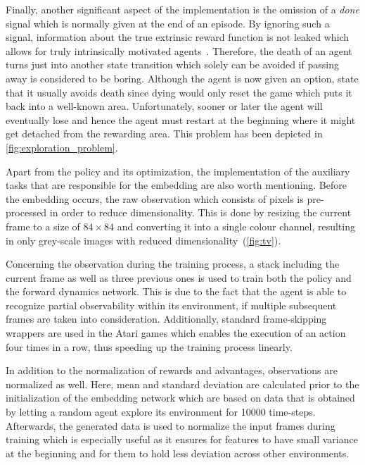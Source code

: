 \documentclass[draft,final]{vutinfth} %
\newcommand{\pautoref}[1]{(\autoref{#1})}
\begin{document}
    Finally, another significant aspect of the implementation is the omission of a \textit{done} signal which is normally given at the end of an episode.
    By ignoring such a signal, information about the true extrinsic reward function is not leaked which allows for truly intrinsically motivated agents~\citep{burda_large-scale_2018-1}.
    Therefore, the death of an agent turns just into another state transition which solely can be avoided if passing away is considered to be boring.
    Although the agent is now given an option, \citet{burda_large-scale_2018-1} state that it usually avoids death since dying would only reset the game which puts it back into a well-known area.
    Unfortunately, sooner or later the agent will eventually lose and hence the agent must restart at the beginning where it might get detached from the rewarding area.
    This problem has been depicted in \autoref{fig:exploration_problem}.

    Apart from the policy and its optimization, the implementation of the auxiliary tasks that are responsible for the embedding are also worth mentioning.
    Before the embedding occurs, the raw observation which consists of pixels is pre-processed in order to reduce dimensionality.
    This is done by resizing the current frame to a size of $84 \times 84$ and converting it into a single colour channel, resulting in only grey-scale images with reduced dimensionality~\pautoref{fig:tv}.

    Concerning the observation during the training process, a stack including the current frame as well as three previous ones is used to train both the policy and the forward dynamics network.
    This is due to the fact that the agent is able to recognize partial observability within its environment, if multiple subsequent frames are taken into consideration.
    Additionally, standard frame-skipping wrappers are used in the Atari games which enables the execution of an action four times in a row, thus speeding up the training process linearly.

    In addition to the normalization of rewards and advantages, observations are normalized as well.
    Here, mean and standard deviation are calculated prior to the initialization of the embedding network which are based on data that is obtained by letting a random agent explore its environment for 10000 time-steps.
    Afterwards, the generated data is used to normalize the input frames during training which is especially useful as it ensures for features to have small variance at the beginning and for them to hold less deviation across other environments.
\end{document}
